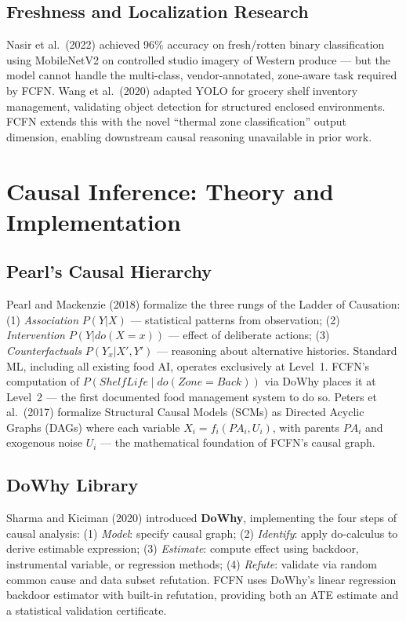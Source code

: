 \documentclass[12pt,a4paper]{report}
\begin{document}
\subsection{Freshness and Localization Research}
Nasir et al.\ (2022) \cite{nasir2022} achieved 96\% accuracy on fresh/rotten binary classification using MobileNetV2 on controlled studio imagery of Western produce — but the model cannot handle the multi-class, vendor-annotated, zone-aware task required by FCFN. Wang et al.\ (2020) \cite{wang2020} adapted YOLO for grocery shelf inventory management, validating object detection for structured enclosed environments. FCFN extends this with the novel ``thermal zone classification'' output dimension, enabling downstream causal reasoning unavailable in prior work.

\section{Causal Inference: Theory and Implementation}

\subsection{Pearl's Causal Hierarchy}
Pearl and Mackenzie (2018) \cite{pearl2018} formalize the three rungs of the Ladder of Causation: (1) \textit{Association} $P(Y|X)$ — statistical patterns from observation; (2) \textit{Intervention} $P(Y|do(X=x))$ — effect of deliberate actions; (3) \textit{Counterfactuals} $P(Y_{x}|X',Y')$ — reasoning about alternative histories. Standard ML, including all existing food AI, operates exclusively at Level~1. FCFN's computation of $P(ShelfLife \mid do(Zone=Back))$ via DoWhy places it at Level~2 — the first documented food management system to do so. Peters et al.\ (2017) \cite{peters2017} formalize Structural Causal Models (SCMs) as Directed Acyclic Graphs (DAGs) where each variable $X_i = f_i(PA_i, U_i)$, with parents $PA_i$ and exogenous noise $U_i$ — the mathematical foundation of FCFN's causal graph.

\subsection{DoWhy Library}
Sharma and Kiciman (2020) \cite{sharma2020} introduced \textbf{DoWhy}, implementing the four steps of causal analysis: (1) \textit{Model}: specify causal graph; (2) \textit{Identify}: apply do-calculus to derive estimable expression; (3) \textit{Estimate}: compute effect using backdoor, instrumental variable, or regression methods; (4) \textit{Refute}: validate via random common cause and data subset refutation. FCFN uses DoWhy's linear regression backdoor estimator with built-in refutation, providing both an ATE estimate and a statistical validation certificate.
\end{document}
